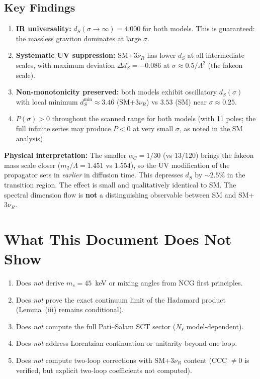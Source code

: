 \documentclass[11pt,a4paper]{article}
\begin{document}
\subsection{Key Findings}

\begin{enumerate}
  \item \textbf{IR universality:} $d_S(\sigma \to \infty) = 4.000$ for both models.
    This is guaranteed: the massless graviton dominates at large $\sigma$.
  \item \textbf{Systematic UV suppression:} SM+$3\nu_R$ has lower $d_S$ at all
    intermediate scales, with maximum deviation $\Delta d_S = -0.086$ at
    $\sigma \approx 0.5/\Lambda^2$ (the fakeon scale).
  \item \textbf{Non-monotonicity preserved:} both models exhibit oscillatory
    $d_S(\sigma)$ with local minimum $d_S^{\mathrm{min}} \approx 3.46$
    (SM+$3\nu_R$) vs $3.53$ (SM) near $\sigma \approx 0.25$.
  \item \textbf{$P(\sigma) > 0$} throughout the scanned range for both models
    (with 11 poles; the full infinite series may produce $P < 0$ at very
    small $\sigma$, as noted in the SM analysis).
\end{enumerate}

\textbf{Physical interpretation:} The smaller $\alpha_C = 1/30$ (vs $13/120$)
brings the fakeon mass scale closer ($m_2/\Lambda = 1.451$ vs $1.554$),
so the UV modification of the propagator sets in \emph{earlier} in diffusion time.
This depresses $d_S$ by $\sim 2.5\%$ in the transition region.
The effect is small and qualitatively identical to SM.
The spectral dimension flow is \textbf{not} a distinguishing observable
between SM and SM+$3\nu_R$.


\section{What This Document Does Not Show}

\begin{enumerate}
  \item Does \emph{not} derive $m_s = 45$~keV or mixing angles from NCG first principles.
  \item Does \emph{not} prove the exact continuum limit of the Hadamard product
        (Lemma~(iii) remains conditional).
  \item Does \emph{not} compute the full Pati--Salam SCT sector
        ($N_s$ model-dependent).
  \item Does \emph{not} address Lorentzian continuation or unitarity beyond one loop.
  \item Does \emph{not} compute two-loop corrections with SM+$3\nu_R$ content
        (CCC $\neq 0$ is verified, but explicit two-loop coefficients not computed).
\end{enumerate}
\end{document}
